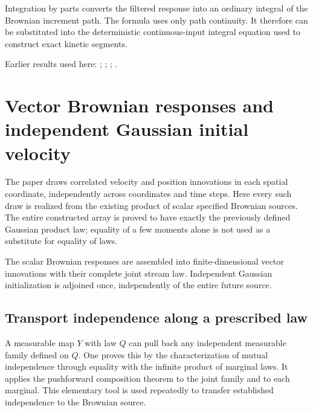 \documentclass[11pt,a4paper]{report}
\begin{document}
Integration by parts converts the filtered response into an ordinary integral of the Brownian increment path. The formula uses only path continuity. It therefore can be substituted into the deterministic continuous-input integral equation used to construct exact kinetic segments.



Earlier results used here: \cite[Section~3.6.12]{LangevinLean2026ULASC}; \cite[Section~3.8.2]{LangevinLean2026ULASC}; \cite[Section~3.8.5]{LangevinLean2026ULASC}; \cite[Section~3.8.9]{LangevinLean2026ULASC}.
\section{\texorpdfstring{Vector Brownian responses and independent Gaussian initial velocity}{Vector Brownian responses and independent Gaussian initial velocity}}
\label{proof-module-KineticLangevin-CanonicalVectorSegments-lean}


The paper draws correlated velocity and position innovations in each spatial coordinate, independently across coordinates and time steps. Here every such draw is realized from the existing product of scalar specified Brownian sources. The entire constructed array is proved to have exactly the previously defined Gaussian product law; equality of a few moments alone is not used as a substitute for equality of laws.



The scalar Brownian responses are assembled into finite-dimensional vector innovations with their complete joint stream law. Independent Gaussian initialization is adjoined once, independently of the entire future source.

\subsection{\texorpdfstring{Transport independence along a prescribed law}{Transport independence along a prescribed law}}
\label{report-step-KineticLangevin-CanonicalVectorSegments-lean-1}


A measurable map \(Y\) with law \(Q\) can pull back any independent measurable family defined on \(Q\). One proves this by the characterization of mutual independence through equality with the infinite product of marginal laws. It applies the pushforward composition theorem to the joint family and to each marginal. This elementary tool is used repeatedly to transfer established independence to the Brownian source.
\end{document}

